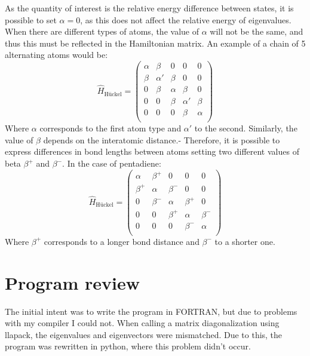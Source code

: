 \documentclass{article}
\begin{document}
As the quantity of interest is the relative energy difference between states, it is possible to set $\alpha=0$, as this does not affect the relative energy of eigenvalues. When there are different types of atoms, the value of $\alpha$ will not be the same, and thus this must be reflected in the Hamiltonian matrix. An example of a chain of 5 alternating atoms would be:
\begin{equation}
    \hat{H}_{\textrm{Hückel}}  =
    \begin{pmatrix}
        \alpha & \beta & 0 & 0 & 0 \\
        \beta & \alpha'  & \beta & 0 & 0 \\
        0 & \beta & \alpha & \beta & 0 \\
        0 & 0 & \beta & \alpha'  & \beta \\
        0 & 0 & 0 & \beta & \alpha \\
    \end{pmatrix}
\end{equation}
Where $\alpha$ corresponds to the first atom type and $\alpha'$ to the second. Similarly, the value of $\beta$ depends on the interatomic distance.- Therefore, it is possible to express differences in bond lengths between atoms setting two different values of beta $\beta^+$ and $\beta^-$. In the case of pentadiene: 
\begin{equation}
    \hat{H}_{\textrm{Hückel}}  =
    \begin{pmatrix}
        \alpha & \beta^+ & 0 & 0 & 0 \\
        \beta^+ & \alpha & \beta^- & 0 & 0 \\
        0 & \beta^- & \alpha & \beta^+ & 0 \\
        0 & 0 & \beta^+ & \alpha & \beta^- \\
        0 & 0 & 0 & \beta^- & \alpha \\
    \end{pmatrix}
\end{equation}
Where  $\beta^+$ corresponds to a longer bond distance and $\beta^-$ to a shorter one. 

\section{Program review}
The initial intent was to write the program in FORTRAN, but due to problems with my compiler I could not. When calling a matrix diagonalization using llapack, the eigenvalues and eigenvectors were mismatched. Due to this, the program was rewritten in python, where this problem didn't occur. 
\end{document}
